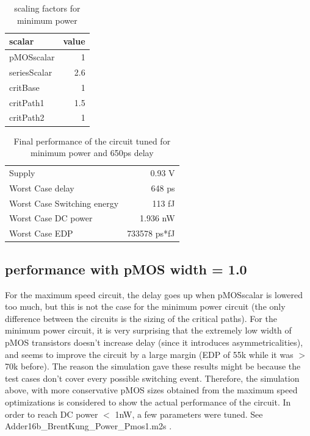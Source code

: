 \documentclass[english]{article}
\begin{document}
\begin{table}[h]
\centering
\begin{tabular}{ |l|r| }
\hline
scalar	& value \\
\hline
 pMOSscalar		& 1 \\
 seriesScalar   & 2.6 \\
 critBase   	& 1 \\
 critPath1   	& 1.5 \\
 critPath2    	& 1 \\
\hline
\end{tabular}
\caption{scaling factors for minimum power}
\label{MinPowerScalars}
\end{table}

\begin{table}[h]
\centering
\begin{tabular}{ |l|r| }
\hline
Supply	&	0.93 V \\
Worst Case delay &            648 ps \\
Worst Case Switching energy & 113 fJ\\
Worst Case DC power &        1.936 nW \\
Worst Case EDP &              733578 ps*fJ \\
\hline
\end{tabular}
\caption{Final performance of the circuit tuned for minimum power and 650ps delay}
\label{PowerPerformance}
\end{table}   


\subsection{performance with pMOS width = 1.0}

For the maximum speed circuit, the delay goes up when pMOSscalar is lowered too much, but this is not the case for the minimum power circuit (the only difference between the circuits is the sizing of the critical paths).
For the minimum power circuit, it is very surprising that the extremely low width of pMOS transistors doesn't increase delay (since it introduces asymmetricalities), and seems to improve the circuit by a large margin (EDP of 55k while it was $>$ 70k before). The reason the simulation gave these results might be because the test cases don't cover every possible switching event. 
Therefore, the simulation above, with more conservative pMOS sizes obtained from the maximum speed optimizations is considered to show the actual performance of the circuit.
In order to reach DC power $<$ 1nW, a few parameters were tuned. See Adder16b\_BrentKung\_Power\_Pmos1.m2s .
\end{document}
